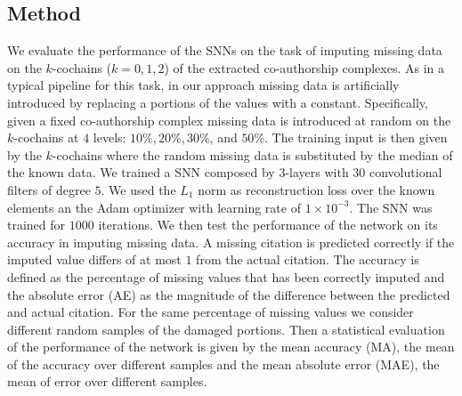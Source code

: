 \subsection{Method}
We evaluate the performance of the SNNs on the task of imputing missing data on the $k$-cochains ($k=0,1,2$) of the extracted co-authorship complexes. As in a typical pipeline for this task, in our approach missing data is artificially introduced by replacing a portions of the values with a constant. Specifically, given a fixed co-authorship complex missing data is introduced at random on the $k$-cochains at $4$ levels: $10\%,  20\%,  30\%$, and $50\% $. The training input is then given by the $k$-cochains where the random missing data is substituted by the median of the known data. We trained a SNN composed by $3$-layers with $30$ convolutional filters of degree $5$. We used the $L_1$ norm as reconstruction loss over the known elements an the Adam optimizer with learning rate of $1\times 10^{-3}$. The SNN was trained for $1000$ iterations. We then test the performance of the network on its accuracy in imputing missing data. A missing citation is predicted correctly if the imputed value differs of at most $1$ from the actual citation. The accuracy is defined as the percentage of missing values that has been correctly imputed and the absolute error (AE) as the magnitude of the difference between the predicted and actual citation. For the same percentage of missing values we consider different random samples of the damaged portions. Then a statistical evaluation of the performance of the network is given by the mean accuracy (MA), the mean of the accuracy over different samples and the mean absolute error (MAE), the mean of error over different samples.


